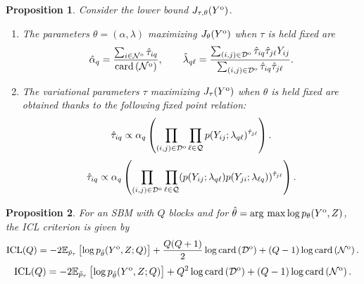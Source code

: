\documentclass[10pt]{article}
\newcommand{\1}{\mathds{1}}
\newcommand{\MA}{Y}
\newcommand{\MAO}{\MA^\text{\rm o}}
\newcommand{\card}[1]{\text{\rm card}\left(#1\right)}
\newcommand{\block}{\mathcal{Q}}
\newcommand{\dyad}{\mathcal{D}}
\newcommand{\dyadO}{\dyad^\text{\rm o}}
\newcommand{\node}{\mathcal{N}}
\newcommand{\nodeO}{\node^\text{\rm o}}
\newcommand{\argmax}{\mathop{\mathrm{arg\ max}}}
\newtheorem{proposition}{Proposition}
\begin{document}
\begin{proposition} Consider  the lower  bound $J_{\tau,\theta}(\MAO)$.
  \begin{enumerate}
  \item   The  parameters $\theta=(\alpha,  \lambda)$ maximizing  $J_\theta(\MAO)$
    when $\tau$ is held fixed are
    \begin{equation}\nonumber
      \hat{\alpha}_q=\frac{\sum_{i\in \nodeO}\hat{\tau}_{iq}}{\card{\nodeO}}, \qquad
      \hat{\lambda}_{q\ell}=\frac{\sum_{(i,j)\in
          \dyadO}\hat{\tau}_{iq}\hat{\tau}_{j\ell}\MA_{ij}}{\sum_{(i,j)\in
          \dyadO
        }\hat{\tau}_{iq}\hat{\tau}_{j\ell}}.
    \end{equation}
  \item   The  variational parameters  $\tau$  maximizing $J_\tau(\MAO)$  when
    $\theta$ is held fixed are obtained thanks to the following fixed point relation:
    \begin{equation}\nonumber
      \hat{\tau}_{iq}\propto \alpha_{q} \left( \prod_{(i,j)\in\dyadO}
        \prod_{\ell\in\block} p(\MA_{ij}; \lambda_{q\ell})^{\hat{\tau}_{j\ell}}\right).
    \end{equation}
    \textcolor{red}{    \begin{equation}\nonumber
      \hat{\tau}_{iq}\propto \alpha_{q} \left( \prod_{(i,j)\in\dyadO}
        \prod_{\ell\in\block} (p(\MA_{ij}; \lambda_{q\ell})p(\MA_{ji}; \lambda_{\ell q}))^{\hat{\tau}_{j\ell}}\right).
    \end{equation}}
  \end{enumerate}
\end{proposition}

\begin{proposition}
\label{prop:ICL_MAR}
  For      an      SBM      with     $Q$      blocks      and      for
  $\hat{\theta}=\argmax \log p_{\theta}(\MAO,Z)$, the ICL criterion is
  given by
  \begin{equation}\nonumber
    \mathrm{ICL}(Q)   =    -2   \mathbb{E}_{\tilde   p_\tau}\left[\log
      p_{\hat\theta}(\MAO,  Z   ;  Q)\right]   +  \frac{Q(Q+1)}{2}\log
    \card{\dyadO} + (Q-1)\log \card{\nodeO}. 
  \end{equation}
  \textcolor{red}{  \begin{equation}\nonumber
    \mathrm{ICL}(Q)   =    -2   \mathbb{E}_{\tilde   p_\tau}\left[\log
      p_{\hat\theta}(\MAO,  Z   ;  Q)\right]   +  Q^2\log
    \card{\dyadO} + (Q-1)\log \card{\nodeO}. 
  \end{equation}}
\end{proposition}
\end{document}
